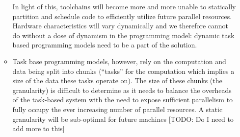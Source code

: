 \begin{itemize}
\begin{itemize}
{              In light of this, toolchains will become more and more
unable to statically partition and schedule code to efficiently
utilize future parallel resources. Hardware characteristics will vary
dynamically and we therefore cannot do without a dose of dynamism in
the programming model: dynamic task based programming models need to
be a part of the solution.
            }
          \item{
              Task base programming models, however, rely on the
computation and data being split into chunks (``tasks'' for the
computation which implies a size of the data these tasks operate
on). The size of these chunks (the granularity) is difficult to
determine as it needs to balance the overheads of the task-based
system with the need to expose sufficient parallelism to fully occupy
the ever increasing number of parallel resources. A static granularity
will be sub-optimal for future machines [TODO: Do I need to add more
to this]
            }
          \end{itemize}




\end{itemize}
